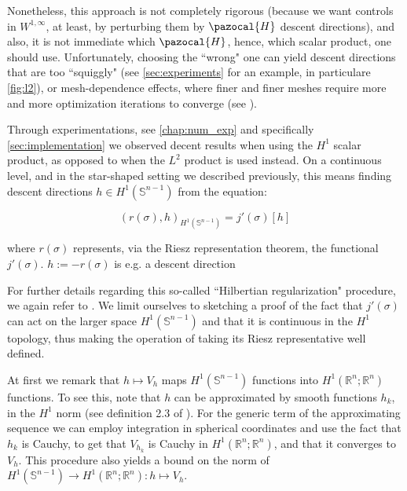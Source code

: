 \documentclass[english,a4paper,9pt,oneside]{scrbook}	%
\theoremstyle{break}
\theoremstyle{remark}
\newcommand{\mR}{\mathbb{R}}
\newcommand{\mS}{\mathbb{S}^{n-1}}
\begin{document}
Nonetheless, this approach is not completely rigorous (because we want controls in $W^{1,\infty}$, at least, by perturbing them by $\pazocal{H}$ descent directions), and also, it is not immediate which $\pazocal{H}$, hence, which scalar product, one should use. Unfortunately, choosing the ``wrong" one can yield descent directions that are too ``squiggly" (see \cref{sec:experiments} for an example, in particulare \cref{fig:l2}), or mesh-dependence effects, where finer and finer meshes require more and more optimization iterations to converge (see \cite{mesh_dependence}).

Through experimentations, see \cref{chap:num_exp} and specifically \cref{sec:implementation} we observed decent results when using the $H^1$ scalar product, as opposed to when the $L^2$ product is used instead. On a continuous level, and in the star-shaped setting we described previously, this means finding descent directions $h \in H^1(\mS)$ from the equation:

$$(r(\sigma),h)_{H^1(\mS)}  = j'(\sigma)[h]$$

where $r(\sigma)$ represents, via the Riesz representation theorem, the functional $j'(\sigma)$. $h:=-r(\sigma)$ is e.g. a descent direction


For further details regarding this so-called ``Hilbertian regularization" procedure, we again refer to \cite{allaire}.
We limit ourselves to sketching a proof of the fact that $j'(\sigma)$ can act on the larger space $H^1(\mS)$ and that it is continuous in the $H^1$ topology, thus making the operation of taking its Riesz representative well defined.

At first we remark that $h\mapsto V_h$ maps $H^1(\mS)$ functions into $H^1(\mR^n;\mR^n)$ functions. To see this, note that $h$ can be approximated by smooth functions $h_k$, in the $H^1$ norm (see definition 2.3 of \cite{aubin}). For the generic term of the approximating sequence we can employ integration in spherical coordinates and use the fact that $h_k$ is Cauchy, to get that $V_{h_k}$ is Cauchy in $H^1(\mR^n;\mR^n)$, and that it converges to $V_h$. This procedure also yields a bound on the norm of $H^1(\mS)\rightarrow H^1(\mR^n;\mR^n): h \mapsto V_h$.
\end{document}

